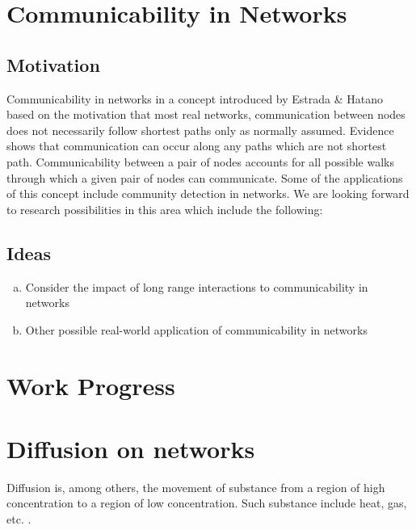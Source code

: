 \documentclass[10pt,a4paper]{article}
\begin{document}
	\section{Communicability in Networks}
	\subsection{Motivation}
	Communicability in networks in a concept introduced by Estrada \& Hatano based on the motivation that most real networks, communication between nodes does not necessarily follow shortest paths only as normally assumed. Evidence shows that communication can occur along any paths which are not shortest path. Communicability between a pair of nodes accounts for all possible walks through which a given pair of nodes can communicate. Some of the applications of this concept include community detection in networks. We are looking forward to research possibilities in this area which include the following:
	\subsection{Ideas}
	\begin{enumerate}[a)]
		\item Consider the impact of long range interactions to communicability in networks
		\item Other possible real-world application of communicability in networks
	\end{enumerate}
	
	
	
	\newpage
	\section*{Work Progress}
    \section{Diffusion on networks}
    Diffusion is, among others, the movement of substance from a region of high concentration to a region of low concentration. Such substance include heat, gas, etc. \citep{newman2010networks}.
    
\end{document}

